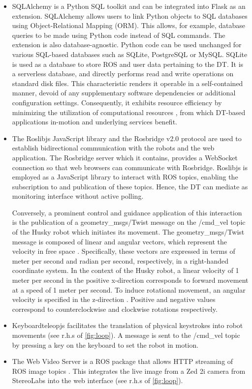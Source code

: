 \documentclass[conference]{IEEEtran}
\begin{document}
\begin{itemize}
\item SQLAlchemy is a Python SQL toolkit and can be integrated into Flask as an extension. SQLAlchemy allows users to link Python objects to SQL databases using Object-Relational Mapping (ORM). This allows, for example, database queries to be made using Python code instead of SQL commands. The extension is also database-agnostic. 
Python code can be used unchanged for various SQL-based databases such as SQLite, PostgreSQL or MySQL. \cite{sqlalchemy} 
SQLite is used as a database to store ROS and user data pertaining to the DT. It is a serverless database, and directly performs read and write operations on standard disk files. This characteristic renders it operable in a self-contained manner, devoid of any supplementary software dependencies or additional configuration settings. Consequently, it exhibits resource efficiency by minimizing the utilization of computational resources \cite{sqlite}, from which DT-based  applications in-motion and underlying services benefit. 
\item The Roslibjs JavaScript library and the Rosbridge v2.0 protocol are used to establish bidirectional communication with the robots and the web application. The Rosbridge server which it contains, provides a WebSocket connection so that web browsers can communicate with Rosbridge.
Roslibjs is employed as a JavaScript library to interact with ROS topics, enabling the subscription to and publication of these topics. \cite{rosbridgeOkState, rosbridgeSuite} Hence,  the DT can mediate as monitoring interface without active polling.

Conversely, a prominent control and guidance application of this interaction is the publication of a geometry\_msgs/Twist message on the /cmd\_vel topic of the Husky robot which initiates its movement.
The geometry\_msgs/Twist message is composed of linear and angular vectors, which represent the velocity in free space \cite{twistmsg}. Specifically, these vectors are expressed in terms of meter per second and radian per second, respectively, in a right-handed coordinate system.
In the context of the Husky robot, a linear velocity of 1 meter per second in the positive x-direction corresponds to forward movement at a speed of 1 meter per second. To induce rotational movement, an angular velocity is specified in the z-direction \cite{huskydriving}. Positive and negative values correspond to counterclockwise and clockwise rotations respectively.
\item Keyboardteleopjs facilitates the translation of physical keystrokes into robot movements (see r.h.s of \cref{fig:loop}). A message is sent to the /cmd\_vel topic by pressing a key on the keyboard to set the robot in motion. \cite{keyboardteleopjs}
\item The Web Video Server is a ROS package that allows HTTP streaming of ROS image topics \cite{webvideoserver}. This integrates the live image from a Zed 2i camera from StereoLabs \cite{zed} into the web interface (see r.h.s of \cref{fig:loop}).


\end{itemize}
\end{document}
